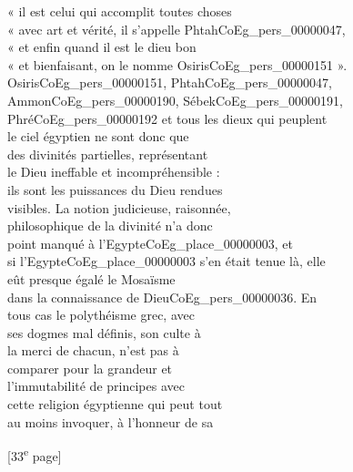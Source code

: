 \documentclass{book}
\begin{document}
{\begin{paracol}{2}
« il est celui qui accomplit toutes choses\\
« avec art et vérité, il s’appelle Phtah\gls{CoEg_pers_00000047},\\
« et enfin quand il est le dieu bon\\
« et bienfaisant, on le nomme Osiris\gls{CoEg_pers_00000151} ».\\
Osiris\gls{CoEg_pers_00000151}, Phtah\gls{CoEg_pers_00000047}, Ammon\gls{CoEg_pers_00000190}, Sébek\gls{CoEg_pers_00000191},\\
Phré\gls{CoEg_pers_00000192} et tous les dieux qui peuplent\\
le ciel égyptien ne sont donc que\\
des divinités partielles, représentant\\
le Dieu ineffable et incompréhensible :\\
ils sont les puissances du Dieu rendues\\
visibles. La notion judicieuse, raisonnée,\\
philosophique de la divinité n’a donc\\
point manqué à l’Egypte\gls{CoEg_place_00000003}, et\\
si l’Egypte\gls{CoEg_place_00000003} s’en était tenue là, elle\\
eût presque égalé le Mosaïsme\\
dans la connaissance de Dieu\gls{CoEg_pers_00000036}. En\\
tous cas le polythéisme grec, avec\\
ses dogmes mal définis, son culte à\\
la merci de chacun, n’est pas à\\
comparer pour la grandeur et\\
l’immutabilité de principes avec\\
cette religion égyptienne qui peut tout\\
au moins invoquer, à l’honneur de sa
\end{paracol}

{\footnotesize\begin{center} {[33\textsuperscript{e} page]}\end{center}}

}
\end{document}
